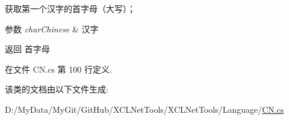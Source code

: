获取第一个汉字的首字母（大写）； 


\begin{DoxyParams}{参数}
{\em char\-Chinese} & 汉字\\
\hline
\end{DoxyParams}
\begin{DoxyReturn}{返回}
首字母
\end{DoxyReturn}


在文件 C\-N.\-cs 第 100 行定义.



该类的文档由以下文件生成\-:\begin{DoxyCompactItemize}
\item 
D\-:/\-My\-Data/\-My\-Git/\-Git\-Hub/\-X\-C\-L\-Net\-Tools/\-X\-C\-L\-Net\-Tools/\-Language/\hyperlink{_c_n_8cs}{C\-N.\-cs}\end{DoxyCompactItemize}
